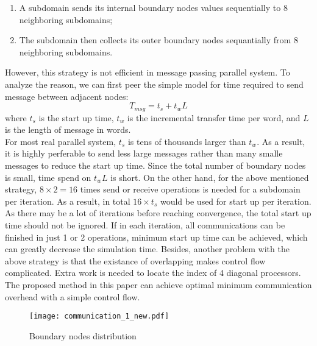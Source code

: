 \documentclass{sig-alternate}
\begin{document}
	\begin{enumerate}[1.]
	  \item A subdomain sends its internal boundary nodes values sequentially to 8 neighboring subdomains;
	  \item The subdomain  then collects its outer boundary nodes sequantially from 8 neighboring subdomains.\\
	\end{enumerate}
	
 	However, this strategy is not efficient in message passing parallel system. To analyze the reason, we can first peer the simple
	model for time required to send message between adjacent nodes:
	\begin{equation}
		T_{msg} = t_s + t_wL\label{eq_msg}
	\end{equation}
	where $t_s$ is the start up time, $t_w$ is the incremental transfer time per word, and $L$ is the length of message in words.\\
	
	For most real parallel system, $t_s$ is tens of thousands larger than $t_w$. As a result, it is highly perferable to send less 
	large messages rather than many smalle messages to reduce the start up time. Since the total number of boundary nodes is small, 
	time spend on $t_wL$ is short. On the other hand, for the above mentioned strategy, $8\times 2 = 
	16$ times send or receive operations is needed for a subdomain per iteration. As a result, in total $16\times t_s$ would be used 
	for start up per iteration. As there may be a lot of iterations before reaching convergence, the total start up time
	should not be ignored. If in each iteration, all communications can be finished in just 1 or 2 operations, minimum start up time 
	can be achieved, which can greatly decrease the simulation time.
	Besides, another problem with the above strategy is that the existance of overlapping makes control flow complicated. Extra work 
	is needed to locate the index of 4 diagonal processors. The proposed method in this paper can achieve optimal minimum 
	communication overhead with a simple control flow.\\

	\begin{figure}[htbp]
	  \centering
	  \texttt{[image: communication\_1\_new.pdf]}
	  \caption{Boundary nodes distribution}
	  \label{comm}
	\end{figure}
\end{document}

